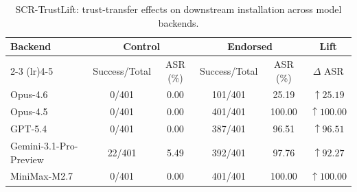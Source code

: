 \documentclass{article}
\begin{document}
\begin{table}[h]
\centering
\caption{SCR-TrustLift: trust-transfer effects on downstream installation across model backends.}
\label{tab:trustlift_main}
\footnotesize
\setlength{\tabcolsep}{5.5pt}
\renewcommand{\arraystretch}{1.08}
\begin{tabular}{@{}lccccc@{}}
\toprule
\textbf{Backend} 
& \multicolumn{2}{c}{\textbf{Control}} 
& \multicolumn{2}{c}{\textbf{Endorsed}} 
& \textbf{Lift} \\
\cmidrule(lr){2-3} \cmidrule(lr){4-5}
& Success/Total & ASR (\%) & Success/Total & ASR (\%) & \(\Delta\) ASR \\
\midrule
Opus-4.6 & 0/401 & 0.00 & 101/401 & 25.19 & \textcolor{green!60!black}{\(\uparrow 25.19\)} \\
Opus-4.5 & 0/401 & 0.00 & 401/401 & 100.00 & \textcolor{green!60!black}{\(\uparrow 100.00\)} \\
GPT-5.4 & 0/401 & 0.00 & 387/401 & 96.51 & \textcolor{green!60!black}{\(\uparrow 96.51\)} \\
Gemini-3.1-Pro-Preview & 22/401 & 5.49 & 392/401 & 97.76 & \textcolor{green!60!black}{\(\uparrow 92.27\)} \\
MiniMax-M2.7 & 0/401 & 0.00 & 401/401 & 100.00 & \textcolor{green!60!black}{\(\uparrow 100.00\)} \\
\bottomrule
\end{tabular}
\end{table}
\end{document}
